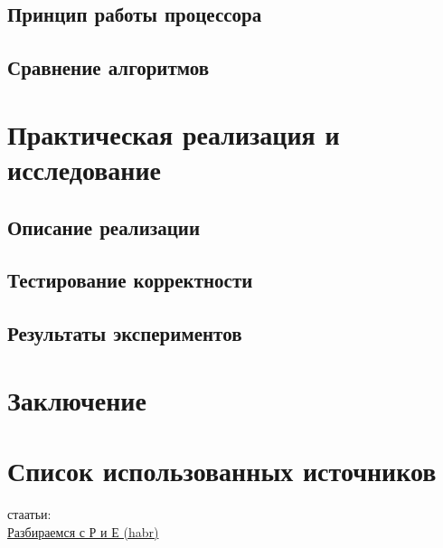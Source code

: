 \documentclass[14pt,a4paper]{extarticle}
\begin{document}
\subsection{Принцип работы процессора}


\subsection{Сравнение алгоритмов}

\newpage
\section{Практическая реализация и исследование}

\subsection{Описание реализации}

\subsection{Тестирование корректности}

\subsection{Результаты экспериментов}

\newpage
\section*{Заключение}

\newpage
\section*{Список использованных источников}
стаатьи: \\
\href{https://habr.com/ru/articles/957702/}{Разбираемся с Р и Е (habr)}
\end{document}
